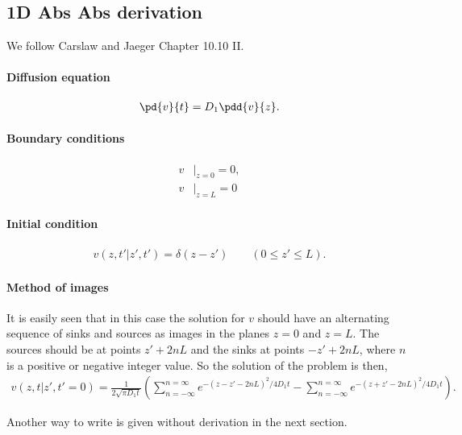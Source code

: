 \subsection{1D Abs Abs derivation}

We follow Carslaw and Jaeger Chapter 10.10 II.


\paragraph{Diffusion equation}
\begin{align}
  \pd{v}{t} = D_1 \pdd{v}{z}.
\end{align}


\paragraph{Boundary conditions}
\begin{align}
  v&|_{z=0} = 0,\\
  v&|_{z=L} = 0
\end{align}


\paragraph{Initial condition}
\begin{align}
  v(z,t'|z',t') = \delta(z-z') \qquad (0 \leq z' \leq L).
\end{align}


\paragraph{Method of images}
It is easily seen that in this case the solution for $v$ should have an 
alternating sequence of sinks and sources as images in the planes $z=0$ and 
$z=L$. The sources should be at points $z'+2nL$ and the sinks at points 
$-z'+2nL$, where $n$ is a positive or negative integer value. So the solution  
of the problem is then,
\begin{align}
  v(z,t|z',t'=0) = \frac{1}{2\sqrt{\pi D_1 t}}
  \left(\sum_{n=-\infty}^{n=\infty} e^{-(z-z'-2nL)^2/4D_1t} - 
  \sum_{n=-\infty}^{n=\infty} e^{-(z+z'-2nL)^2/4D_1t}\right).
\end{align}

Another way to write is given without derivation in the next section.
